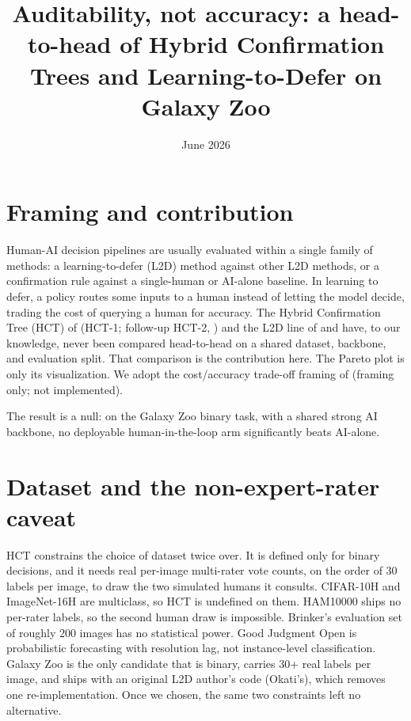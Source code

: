 \documentclass[10pt]{article}
\title{Auditability, not accuracy: a head-to-head of Hybrid Confirmation\\
Trees and Learning-to-Defer on Galaxy Zoo}
\author{}
\date{June 2026}
\begin{document}
\maketitle
\vspace{-2.5em}

\section{Framing and contribution}

Human-AI decision pipelines are usually evaluated within a single family of methods: a
learning-to-defer (L2D) method against other L2D methods, or a confirmation rule against a
single-human or AI-alone baseline. In learning to defer, a policy routes some inputs to a human
instead of letting the model decide, trading the cost of querying a human for accuracy. The Hybrid
Confirmation Tree (HCT) of \citet{berger2026hct} (HCT-1; follow-up HCT-2,
\citealp{berger2026beyond}) and the L2D line of \citet{okati2021differentiable} and
\citet{MozannarS20} have, to our knowledge,
never been compared head-to-head on a shared dataset, backbone, and evaluation split. That
comparison is the contribution here. The Pareto plot is only its visualization. We adopt the
cost/accuracy trade-off framing of \citet{detoni2024predsets} (framing only; not implemented).

The result is a null: on the Galaxy Zoo binary task, with a shared strong AI backbone, no deployable
human-in-the-loop arm significantly beats AI-alone.

\section{Dataset and the non-expert-rater caveat}

HCT constrains the choice of dataset twice over. It is defined only for binary decisions, and it
needs real per-image multi-rater vote counts, on the order of 30 labels per image, to draw the two
simulated humans it consults. CIFAR-10H and ImageNet-16H are multiclass, so HCT is undefined on
them. HAM10000 ships no per-rater labels, so the
second human draw is impossible. Brinker's evaluation set of roughly 200 images has no statistical
power. Good Judgment Open is probabilistic forecasting with resolution lag, not instance-level
classification. Galaxy Zoo is the only candidate that is binary, carries 30+ real labels per image,
and ships with an original L2D author's code (Okati's), which removes one re-implementation. Once we
chosen, the same two constraints left no alternative.
\end{document}
